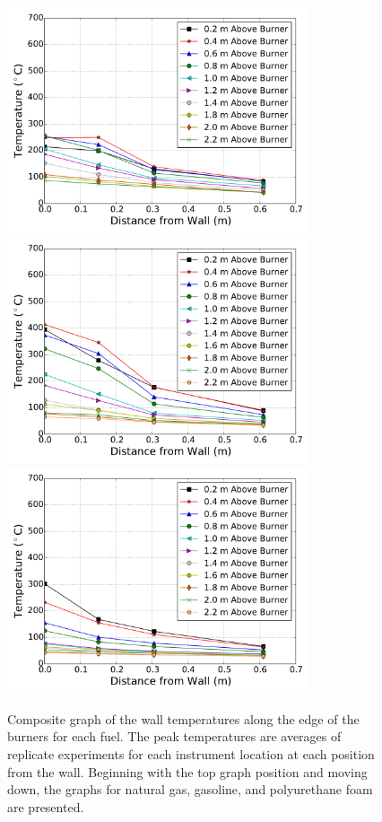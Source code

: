 \documentclass[twoside]{uocthesis}
\begin{document}
{\begin{figure}[p]
	\centering
	\includegraphics[width=3.5in]{../Figures/NCTW_NG_TC_Surface_Offset_Avg}\\
	\includegraphics[width=3.5in]{../Figures/NCTW_GAS_TC_Surface_Offset_Avg}\\
	\includegraphics[width=3.5in]{../Figures/NCTW_PUF_TC_Surface_Offset_Avg}\\
	\caption[Composite graph of the wall temperatures along the edge of the burners]{Composite graph of the wall temperatures along the edge of the burners for each fuel. The peak temperatures are averages of replicate experiments for each instrument location at each position from the wall. Beginning with the top graph position and moving down, the graphs for natural gas, gasoline, and polyurethane foam are presented.}
	\label{NCTW_Surf_Edge_comp}
\end{figure}


}
\end{document}
